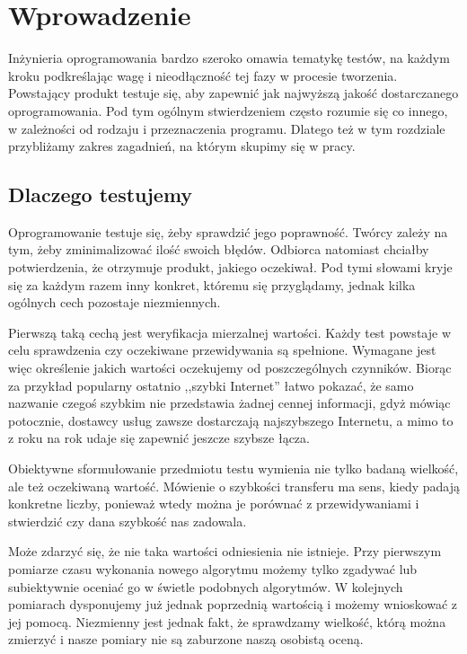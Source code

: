 \documentclass[00-praca-magisterska.tex]{subfiles}
\begin{document}
\chapter{Wprowadzenie}

Inżynieria oprogramowania bardzo szeroko omawia tematykę testów, na każdym
kroku podkreślając wagę i nieodłączność tej fazy w procesie tworzenia.
Powstający produkt testuje się, aby zapewnić jak najwyższą jakość dostarczanego
oprogramowania. Pod tym ogólnym stwierdzeniem często rozumie się co innego, w
zależności od rodzaju i przeznaczenia programu. Dlatego też w tym rozdziale
przybliżamy zakres zagadnień, na którym skupimy się w pracy.

\section{Dlaczego testujemy}

Oprogramowanie testuje się, żeby sprawdzić jego poprawność. Twórcy zależy na
tym, żeby zminimalizować ilość swoich błędów. Odbiorca natomiast chciałby
potwierdzenia, że otrzymuje produkt, jakiego oczekiwał. Pod tymi słowami kryje
się za każdym razem inny konkret, któremu się przyglądamy, jednak kilka
ogólnych cech pozostaje niezmiennych.

Pierwszą taką cechą jest weryfikacja mierzalnej wartości. Każdy test powstaje w
celu sprawdzenia czy oczekiwane przewidywania są spełnione. Wymagane jest więc
określenie jakich wartości oczekujemy od poszczególnych czynników. Biorąc za
przykład popularny ostatnio ,,szybki Internet'' łatwo pokazać, że samo nazwanie
czegoś szybkim nie przedstawia żadnej cennej informacji, gdyż mówiąc potocznie,
dostawcy usług zawsze dostarczają najszybszego Internetu, a mimo to z roku na
rok udaje się zapewnić jeszcze szybsze łącza.

Obiektywne sformułowanie przedmiotu testu wymienia nie tylko badaną wielkość,
ale też oczekiwaną wartość. Mówienie o szybkości transferu ma sens, kiedy
padają konkretne liczby, ponieważ wtedy można je porównać z przewidywaniami i
stwierdzić czy dana szybkość nas zadowala.

Może zdarzyć się, że nie taka wartości odniesienia nie istnieje. Przy pierwszym
pomiarze czasu wykonania nowego algorytmu możemy tylko zgadywać lub
subiektywnie oceniać go w świetle podobnych algorytmów. W kolejnych pomiarach
dysponujemy już jednak poprzednią wartością i możemy wnioskować z jej pomocą.
Niezmienny jest jednak fakt, że sprawdzamy wielkość, którą można zmierzyć i
nasze pomiary nie są zaburzone naszą osobistą oceną.
\end{document}
